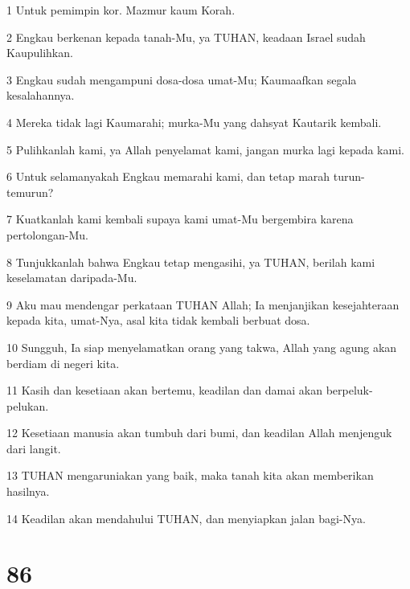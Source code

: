 \par 1 Untuk pemimpin kor. Mazmur kaum Korah.
\par 2 Engkau berkenan kepada tanah-Mu, ya TUHAN, keadaan Israel sudah Kaupulihkan.
\par 3 Engkau sudah mengampuni dosa-dosa umat-Mu; Kaumaafkan segala kesalahannya.
\par 4 Mereka tidak lagi Kaumarahi; murka-Mu yang dahsyat Kautarik kembali.
\par 5 Pulihkanlah kami, ya Allah penyelamat kami, jangan murka lagi kepada kami.
\par 6 Untuk selamanyakah Engkau memarahi kami, dan tetap marah turun-temurun?
\par 7 Kuatkanlah kami kembali supaya kami umat-Mu bergembira karena pertolongan-Mu.
\par 8 Tunjukkanlah bahwa Engkau tetap mengasihi, ya TUHAN, berilah kami keselamatan daripada-Mu.
\par 9 Aku mau mendengar perkataan TUHAN Allah; Ia menjanjikan kesejahteraan kepada kita, umat-Nya, asal kita tidak kembali berbuat dosa.
\par 10 Sungguh, Ia siap menyelamatkan orang yang takwa, Allah yang agung akan berdiam di negeri kita.
\par 11 Kasih dan kesetiaan akan bertemu, keadilan dan damai akan berpeluk-pelukan.
\par 12 Kesetiaan manusia akan tumbuh dari bumi, dan keadilan Allah menjenguk dari langit.
\par 13 TUHAN mengaruniakan yang baik, maka tanah kita akan memberikan hasilnya.
\par 14 Keadilan akan mendahului TUHAN, dan menyiapkan jalan bagi-Nya.

\chapter{86}


